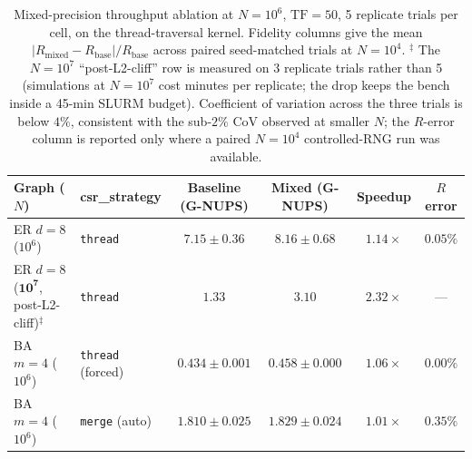 \documentclass[a4paper,fleqn]{cas-sc}
\theoremstyle{definition}
\theoremstyle{remark}
\begin{document}
\begin{table}[!htbp]
\caption{Mixed-precision throughput ablation at $N{=}10^6$, $\mathrm{TF}{=}50$, 5 replicate trials per cell, on the thread-traversal kernel. Fidelity columns give the mean $|R_\text{mixed} - R_\text{base}| / R_\text{base}$ across paired seed-matched trials at $N{=}10^4$. $^\ddagger$ The $N{=}10^7$ ``post-L2-cliff'' row is measured on 3 replicate trials rather than 5 (simulations at $N{=}10^7$ cost minutes per replicate; the drop keeps the bench inside a 45-min SLURM budget). Coefficient of variation across the three trials is below $4\%$, consistent with the sub-$2\%$ CoV observed at smaller $N$; the $R$-error column is reported only where a paired $N{=}10^4$ controlled-RNG run was available.}
\label{tab:mixed_precision_summary}
%
\centering
\begin{tabular*}{\tblwidth}{@{\extracolsep{\fill}}llcccc@{}}
\toprule
\textbf{Graph ($N$)} & \textbf{csr\_strategy} & \textbf{Baseline (G-NUPS)} & \textbf{Mixed (G-NUPS)} & \textbf{Speedup} & \textbf{$R$ error} \\
\midrule
ER $d{=}8$ ($10^6$)  & \texttt{thread}          & $7.15 \pm 0.36$ & $8.16 \pm 0.68$ & $1.14\times$ & $0.05\%$ \\
ER $d{=}8$ ($\mathbf{10^7}$, post-L2-cliff)$^\ddagger$ & \texttt{thread} & $1.33$ & $3.10$ & $\mathbf{2.32\times}$ & --- \\
BA $m{=}4$ ($10^6$)  & \texttt{thread} (forced) & $0.434 \pm 0.001$ & $0.458 \pm 0.000$ & $1.06\times$ & $0.00\%$ \\
BA $m{=}4$ ($10^6$)  & \texttt{merge} (auto)    & $1.810 \pm 0.025$ & $1.829 \pm 0.024$ & $1.01\times$ & $0.35\%$ \\
\bottomrule
\end{tabular*}
\end{table}
\end{document}
